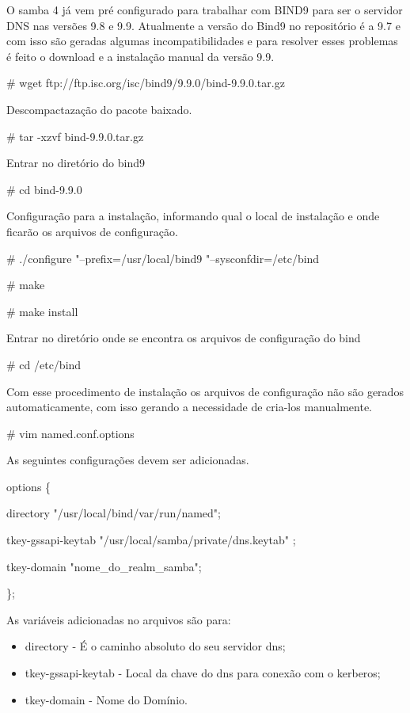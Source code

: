 O samba 4 já vem pré configurado para trabalhar com BIND9 para ser o servidor DNS nas versões 9.8 e 9.9.
Atualmente a versão do Bind9 no repositório é a 9.7 e com isso são geradas algumas incompatibilidades e para resolver esses problemas é feito o download e a instalação manual da versão 9.9.

\# wget ftp://ftp.isc.org/isc/bind9/9.9.0/bind-9.9.0.tar.gz

Descompactazação do pacote baixado.
 
\# tar -xzvf bind-9.9.0.tar.gz

Entrar no diretório do bind9

\# cd bind-9.9.0

Configuração para a instalação, informando qual o local de instalação e onde ficarão os arquivos de configuração.

\# ./configure "--prefix=/usr/local/bind9 "--sysconfdir=/etc/bind

\# make

\# make install
% 

Entrar no diretório onde se encontra os arquivos de configuração do bind

\# cd /etc/bind

Com esse procedimento de instalação os arquivos de configuração não são gerados automaticamente, com isso gerando a necessidade de cria-los manualmente.

\# vim named.conf.options

As seguintes configurações devem ser adicionadas.

options \{
	
directory "/usr/local/bind/var/run/named";

tkey-gssapi-keytab "/usr/local/samba/private/dns.keytab" ;

tkey-domain "nome\_do\_realm\_samba";
	
\};

As variáveis adicionadas no arquivos são para:

\begin{itemize}
	\item{directory} -  É o caminho absoluto do seu servidor dns;
	\item{tkey-gssapi-keytab} - Local da chave do dns para conexão com o kerberos;
	\item{tkey-domain} - Nome do Domínio.
\end{itemize}

